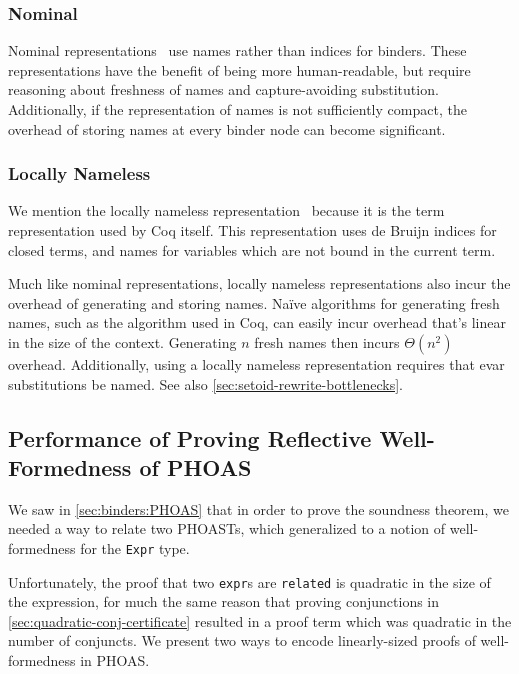 \subsubsection{Nominal} \label{sec:binders:nominal}
Nominal representations~\cite{Nominal2003Pitts} use names rather than indices for binders.
These representations have the benefit of being more human-readable, but require reasoning about freshness of names and capture-avoiding substitution.
Additionally, if the representation of names is not sufficiently compact, the overhead of storing names at every binder node can become significant.

\subsubsection{Locally Nameless} \label{sec:binders:locally-nameless}
We mention the locally nameless representation~\cite{Locally2012Chargueraud,locally2007Leroy} because it is the term representation used by Coq itself.
This representation uses de Bruijn indices for closed terms, and names for variables which are not bound in the current term.

Much like nominal representations, locally nameless representations also incur the overhead of generating and storing names.
Na\"ive algorithms for generating fresh names, such as the algorithm used in Coq, can easily incur overhead that's linear in the size of the context.
Generating $n$ fresh names then incurs $\mathcal \Theta(n^2)$ overhead.
Additionally, using a locally nameless representation requires that evar substitutions be named.
See also \autoref{sec:setoid-rewrite-bottlenecks}.

\subsection{Performance of Proving Reflective Well-Formedness of PHOAS} \label{sec:wf:perf}

We saw in \autoref{sec:binders:PHOAS} that in order to prove the soundness theorem, we needed a way to relate two PHOASTs, which generalized to a notion of well-formedness for the \texttt{Expr} type.

Unfortunately, the proof that two \texttt{expr}s are \texttt{related} is quadratic in the size of the expression, for much the same reason that proving conjunctions in \autoref{sec:quadratic-conj-certificate} resulted in a proof term which was quadratic in the number of conjuncts.
We present two ways to encode linearly-sized proofs of well-formedness in PHOAS.

